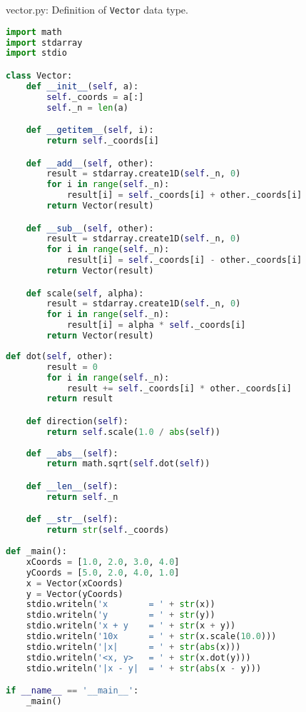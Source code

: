\documentclass[8pt,a4paper,compress]{beamer}
\begin{document}
\begin{frame}[fragile]
\pause

\begin{framed}
\tiny vector.py: Definition of \lstinline{Vector} data type.
\end{framed}

\begin{lstlisting}[language=Python]
import math
import stdarray
import stdio

class Vector:
    def __init__(self, a):
        self._coords = a[:]
        self._n = len(a)

    def __getitem__(self, i):
        return self._coords[i]

    def __add__(self, other):
        result = stdarray.create1D(self._n, 0)
        for i in range(self._n):
            result[i] = self._coords[i] + other._coords[i]
        return Vector(result)

    def __sub__(self, other):
        result = stdarray.create1D(self._n, 0)
        for i in range(self._n):
            result[i] = self._coords[i] - other._coords[i]
        return Vector(result)

    def scale(self, alpha):
        result = stdarray.create1D(self._n, 0)
        for i in range(self._n):
            result[i] = alpha * self._coords[i]
        return Vector(result)
\end{lstlisting}
\end{frame}

\begin{frame}[fragile]
\pause

\begin{lstlisting}[language=Python]
    def dot(self, other):
        result = 0
        for i in range(self._n):
            result += self._coords[i] * other._coords[i]
        return result

    def direction(self):
        return self.scale(1.0 / abs(self))
     
    def __abs__(self):
        return math.sqrt(self.dot(self))

    def __len__(self):
        return self._n

    def __str__(self):
        return str(self._coords)
        
def _main():
    xCoords = [1.0, 2.0, 3.0, 4.0]
    yCoords = [5.0, 2.0, 4.0, 1.0]
    x = Vector(xCoords)
    y = Vector(yCoords)
    stdio.writeln('x        = ' + str(x))
    stdio.writeln('y        = ' + str(y))
    stdio.writeln('x + y    = ' + str(x + y))
    stdio.writeln('10x      = ' + str(x.scale(10.0)))
    stdio.writeln('|x|      = ' + str(abs(x)))
    stdio.writeln('<x, y>   = ' + str(x.dot(y)))
    stdio.writeln('|x - y|  = ' + str(abs(x - y)))

if __name__ == '__main__':
    _main()
\end{lstlisting}
\end{frame}
\end{document}
